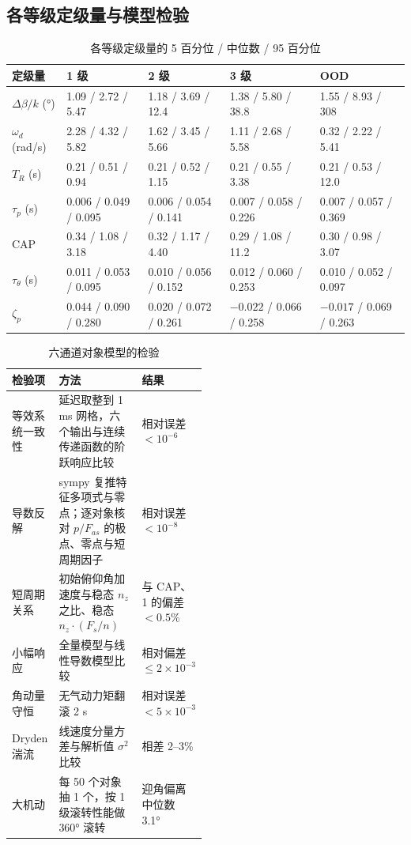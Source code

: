 \documentclass[UTF8,a4paper,11pt,fontset=fandol,scheme=plain]{ctexart}
\begin{document}
\subsection{各等级定级量与模型检验}
\label{app:grade}
\begin{table}[H]
\centering\small
\caption{各等级定级量的 5 百分位 / 中位数 / 95 百分位}\label{tab:grade}
\begin{tabular}{@{}lllll@{}}
\toprule
定级量 & 1 级 & 2 级 & 3 级 & OOD \\
\midrule
\(\Delta\beta/k\) (°) & 1.09 / 2.72 / 5.47 & 1.18 / 3.69 / 12.4 & 1.38 / 5.80 / 38.8 & 1.55 / 8.93 / 308 \\
\(\omega_d\) (rad/s) & 2.28 / 4.32 / 5.82 & 1.62 / 3.45 / 5.66 & 1.11 / 2.68 / 5.58 & 0.32 / 2.22 / 5.41 \\
\(T_R\) (s) & 0.21 / 0.51 / 0.94 & 0.21 / 0.52 / 1.15 & 0.21 / 0.55 / 3.38 & 0.21 / 0.53 / 12.0 \\
\(\tau_p\) (s) & 0.006 / 0.049 / 0.095 & 0.006 / 0.054 / 0.141 & 0.007 / 0.058 / 0.226 & 0.007 / 0.057 / 0.369 \\
CAP & 0.34 / 1.08 / 3.18 & 0.32 / 1.17 / 4.40 & 0.29 / 1.08 / 11.2 & 0.30 / 0.98 / 3.07 \\
\(\tau_\theta\) (s) & 0.011 / 0.053 / 0.095 & 0.010 / 0.056 / 0.152 & 0.012 / 0.060 / 0.253 & 0.010 / 0.052 / 0.097 \\
\(\zeta_p\) & 0.044 / 0.090 / 0.280 & 0.020 / 0.072 / 0.261 & \(-0.022\) / 0.066 / 0.258 & \(-0.017\) / 0.069 / 0.263 \\
\bottomrule
\end{tabular}
\end{table}

\begin{table}[H]
\centering\small
\caption{六通道对象模型的检验}\label{tab:checks}
\begin{tabularx}{\linewidth}{@{}>{\raggedright\arraybackslash}p{0.24\linewidth}Y>{\raggedright\arraybackslash}p{0.25\linewidth}@{}}
\toprule
检验项 & 方法 & 结果 \\
\midrule
等效系统一致性 & 延迟取整到 1 ms 网格，六个输出与连续传递函数的阶跃响应比较 & 相对误差 \(<10^{-6}\) \\
导数反解 & sympy 复推特征多项式与零点；逐对象核对 \(p/F_{as}\) 的极点、零点与短周期因子 & 相对误差 \(<10^{-8}\) \\
短周期关系 & 初始俯仰角加速度与稳态 \(n_z\) 之比、稳态 \(n_z\cdot(F_s/n)\) & 与 CAP、1 的偏差 \(<0.5\%\) \\
小幅响应 & 全量模型与线性导数模型比较 & 相对偏差 \(\le2\times10^{-3}\) \\
角动量守恒 & 无气动力矩翻滚 2 s & 相对误差 \(<5\times10^{-3}\) \\
Dryden 湍流 & 线速度分量方差与解析值 \(\sigma^2\) 比较 & 相差 2–3\% \\
大机动 & 每 50 个对象抽 1 个，按 1 级滚转性能做 360° 滚转 & 迎角偏离中位数 3.1° \\
\bottomrule
\end{tabularx}
\end{table}
\end{document}
